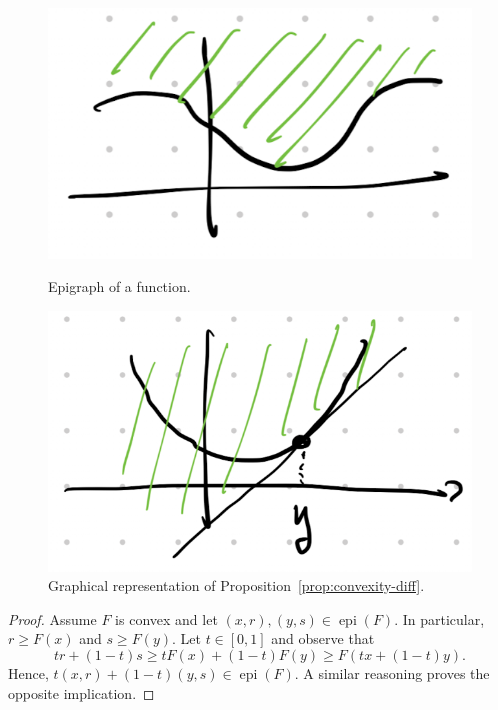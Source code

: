 \documentclass{report}
\begin{document}
	\begin{figure}
		\begin{minipage}{.48\textwidth}
			\centering
			\includegraphics[width=.6\textwidth]{images/epigraph.png}
			\caption{Epigraph of a function.}
		\end{minipage}
		\begin{minipage}{.48\textwidth}
			\centering
			\includegraphics[width=.6\textwidth]{images/convexity-diff.png}
			\caption{Graphical representation of Proposition~\ref{prop:convexity-diff}.}
		\end{minipage}
	\end{figure}

	\begin{proof}
		Assume $F$ is convex and let $(x,r),(y,s)\in\operatorname{epi}(F)$. 
		In particular, $r\ge F(x)$ and $s\ge F(y)$.
		Let $t\in [0,1]$ and observe that
		\begin{equation}
			t r +(1-t)s \ge t F(x)+(1-t)F(y) \ge  F(tx+(1-t)y).
		\end{equation}
		Hence, $t(x,r) + (1-t)(y,s)\in\operatorname{epi}(F)$. A similar reasoning proves the opposite implication.
	\end{proof}	
\end{document}
